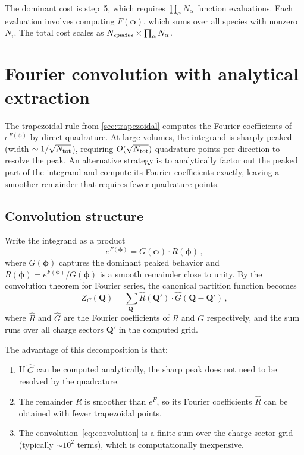 \documentclass[11pt,a4paper]{article}
\newcommand{\bphi}{\bm{\phi}}
\newcommand{\bQ}{\bm{Q}}
\begin{document}
The dominant cost is step~5, which requires $\prod_\alpha N_\alpha$ function evaluations.
Each evaluation involves computing $F(\bphi)$, which sums over all species with nonzero $N_i$.
The total cost scales as $N_{\rm species} \times \prod_\alpha N_\alpha$.


\section{Fourier convolution with analytical extraction}
\label{sec:fourier-convolution}

The trapezoidal rule from \cref{sec:trapezoidal} computes the Fourier coefficients of $e^{F(\bphi)}$ by direct quadrature.
At large volumes, the integrand is sharply peaked (width $\sim 1/\sqrt{N_{\rm tot}}$), requiring $O(\sqrt{N_{\rm tot}})$ quadrature points per direction to resolve the peak.
An alternative strategy is to analytically factor out the peaked part of the integrand and compute its Fourier coefficients exactly, leaving a smoother remainder that requires fewer quadrature points.

\subsection{Convolution structure}
\label{sec:convolution-structure}

Write the integrand as a product
\begin{equation}\label{eq:convolution-factoring}
  e^{F(\bphi)} = G(\bphi) \cdot R(\bphi)\,,
\end{equation}
where $G(\bphi)$ captures the dominant peaked behavior and $R(\bphi) = e^{F(\bphi)} / G(\bphi)$ is a smooth remainder close to unity.
By the convolution theorem for Fourier series, the canonical partition function becomes
\begin{equation}\label{eq:convolution}
  Z_C(\bQ) = \sum_{\bQ'} \hat{R}(\bQ') \cdot \hat{G}(\bQ - \bQ')\,,
\end{equation}
where $\hat{R}$ and $\hat{G}$ are the Fourier coefficients of $R$ and $G$ respectively, and the sum runs over all charge sectors $\bQ'$ in the computed grid.

The advantage of this decomposition is that:
\begin{enumerate}
  \item If $\hat{G}$ can be computed analytically, the sharp peak does not need to be resolved by the quadrature.
  \item The remainder $R$ is smoother than $e^{F}$, so its Fourier coefficients $\hat{R}$ can be obtained with fewer trapezoidal points.
  \item The convolution~\cref{eq:convolution} is a finite sum over the charge-sector grid (typically $\sim 10^2$ terms), which is computationally inexpensive.
\end{enumerate}
\end{document}

